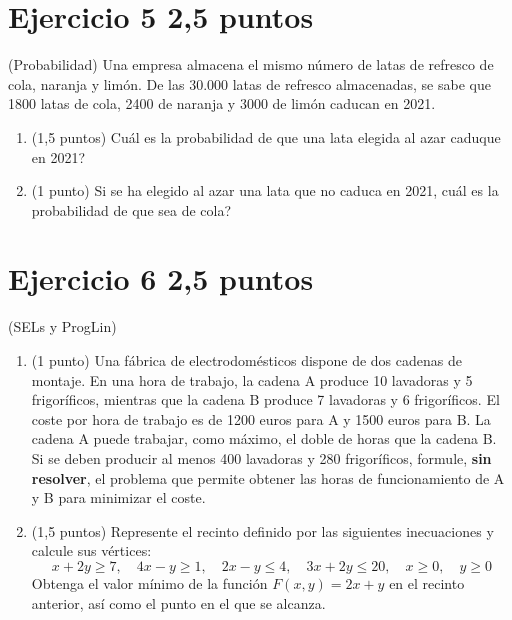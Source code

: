 \documentclass[11pt]{article}
\begin{document}
\section*{Ejercicio 5 \hfill 2,5 puntos} (Probabilidad) Una empresa almacena el mismo número de latas de refresco de cola, naranja y limón. De las 30.000 latas de refresco almacenadas, se sabe que 1800 latas de cola, 2400 de naranja y 3000 de limón caducan en 2021.

\begin{enumerate}[label=(\alph*)]

  \item (1,5 puntos)  \textquestiondown{}Cuál es la probabilidad de que una lata elegida al azar caduque en 2021?

  

  \item (1 punto)  Si se ha elegido al azar una lata que no caduca en 2021, \textquestiondown{}cuál es la probabilidad de que sea de cola?

  

\end{enumerate}






\section*{Ejercicio 6 \hfill 2,5 puntos} (SELs y ProgLin)

\begin{enumerate}[label=(\alph*)]

  \item (1 punto)  Una fábrica de electrodomésticos dispone de dos cadenas de montaje. En una hora de trabajo, la cadena A produce 10 lavadoras y 5 frigoríficos, mientras que la cadena B produce 7 lavadoras y 6 frigoríficos. El coste por hora de trabajo es de 1200 euros para A y 1500 euros para B. La cadena A puede trabajar, como máximo, el doble de horas que la cadena B. Si se deben producir al menos 400 lavadoras y 280 frigoríficos, formule, \textbf{sin resolver}, el problema que permite obtener las horas de funcionamiento de A y B para minimizar el coste.

  

  \item (1,5 puntos)  Represente el recinto definido por las siguientes inecuaciones y calcule sus vértices:
  \[
  x + 2y \geq 7,\quad 4x - y \geq 1,\quad 2x - y \leq 4,\quad 3x + 2y \leq 20,\quad x \geq 0,\quad y \geq 0
  \]
  Obtenga el valor mínimo de la función \( F(x, y) = 2x + y \) en el recinto anterior, así como el punto en el que se alcanza.

  

\end{enumerate}
\end{document}
